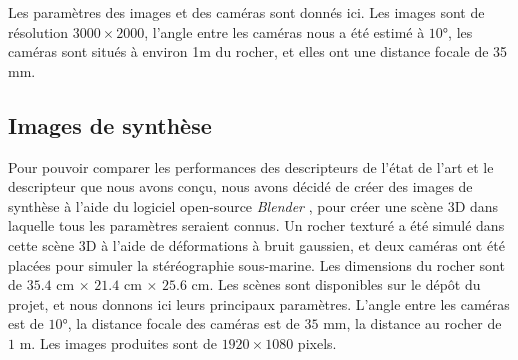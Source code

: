 \documentclass[
	a4paper, %
	10pt, %
	unnumberedsections, %
	twoside, %
]{LTJournalArticle}
\begin{document}
Les paramètres des images et des caméras sont donnés ici.
Les images sont de résolution $3000 \times 2000$, l'angle entre les caméras nous a été estimé à $10$°, les caméras sont situés à environ 1m du rocher, et elles ont une distance focale de 35 mm.



\subsection{Images de synthèse}

Pour pouvoir comparer les performances des descripteurs de l'état de l'art et le descripteur que nous avons conçu, nous avons décidé de créer des images de synthèse à l'aide du logiciel open-source \textit{Blender} \autocite{Blender}, pour créer une scène 3D dans laquelle tous les paramètres seraient connus.
Un rocher texturé a été simulé dans cette scène 3D à l'aide de déformations à bruit gaussien, et deux caméras ont été placées pour simuler la stéréographie sous-marine. Les dimensions du rocher sont de $35.4$ cm $\times$ $21.4$ cm $\times$ $25.6$ cm.
Les scènes sont disponibles sur le dépôt du projet, et nous donnons ici leurs principaux paramètres.
L'angle entre les caméras est de $10$°, la distance focale des caméras est de $35$ mm, la distance au rocher de $1$ m. Les images produites sont de $1920 \times 1080$ pixels.
\end{document}
